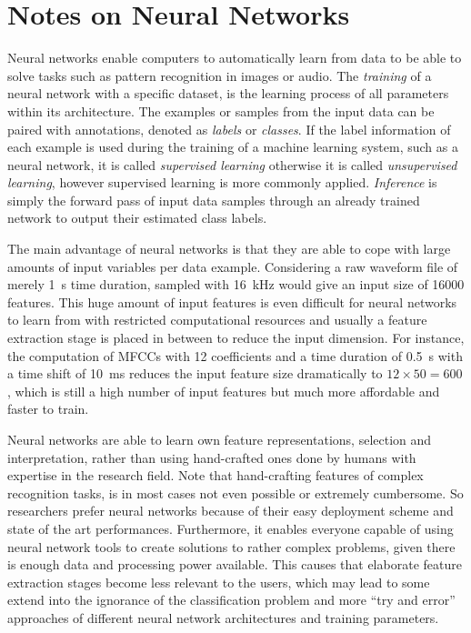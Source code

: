
\section{Notes on Neural Networks}\label{sec:intro_nn}
Neural networks enable computers to automatically learn from data to be able to solve tasks such as pattern recognition in images or audio.
The \emph{training} of a neural network with a specific dataset, is the learning process of all parameters within its architecture.
The examples or samples from the input data can be paired with annotations, denoted as \emph{labels} or \emph{classes}.
If the label information of each example is used during the training of a machine learning system, such as a neural network, it is called \emph{supervised learning} otherwise it is called \emph{unsupervised learning}, however supervised learning is more commonly applied.
\emph{Inference} is simply the forward pass of input data samples through an already trained network to output their estimated class labels.

The main advantage of neural networks is that they are able to cope with large amounts of input variables per data example.
Considering a raw waveform file of merely \SI{1}{s} time duration, sampled with \SI{16}{\kilo\hertz} would give an input size of 16000 features.
This huge amount of input features is even difficult for neural networks to learn from with restricted computational resources and usually a feature extraction stage is placed in between to reduce the input dimension.
For instance, the computation of MFCCs with 12 coefficients and a time duration of \SI{0.5}{s} with a time shift of \SI{10}{\milli\second} reduces the input feature size dramatically to $12 \times 50 = 600$, which is still a high number of input features but much more affordable and faster to train.

Neural networks are able to learn own feature representations, selection and interpretation, rather than using hand-crafted ones done by humans with expertise in the research field.
Note that hand-crafting features of complex recognition tasks, is in most cases not even possible or extremely cumbersome.
So researchers prefer neural networks because of their easy deployment scheme and state of the art performances.
Furthermore, it enables everyone capable of using neural network tools to create solutions to rather complex problems, given there is enough data and processing power available.
This causes that elaborate feature extraction stages become less relevant to the users, which may lead to some extend into the ignorance of the classification problem and more \enquote{try and error} approaches of different neural network architectures and training parameters.

